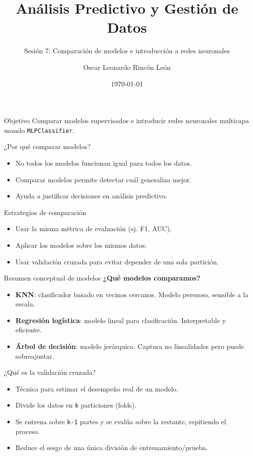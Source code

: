 \documentclass{beamer}
\title{Análisis Predictivo y Gestión de Datos}
\subtitle{Sesión 7: Comparación de modelos e introducción a redes neuronales}
\author{Oscar Leonardo Rincón León}
\date{\today}
\begin{document}
\begin{frame}
  \titlepage
\end{frame}

\begin{frame}{Objetivo}
  Comparar modelos supervisados e introducir redes neuronales multicapa usando \texttt{MLPClassifier}.
\end{frame}

\begin{frame}{¿Por qué comparar modelos?}
  \begin{itemize}
    \item No todos los modelos funcionan igual para todos los datos.
    \item Comparar modelos permite detectar cuál generaliza mejor.
    \item Ayuda a justificar decisiones en análisis predictivo.
  \end{itemize}
\end{frame}

\begin{frame}{Estrategias de comparación}
  \begin{itemize}
    \item Usar la misma métrica de evaluación (ej. F1, AUC).
    \item Aplicar los modelos sobre los mismos datos.
    \item Usar validación cruzada para evitar depender de una sola partición.
  \end{itemize}
\end{frame}

\begin{frame}{Resumen conceptual de modelos}
  \textbf{¿Qué modelos comparamos?}
  \begin{itemize}
    \item \textbf{KNN}: clasificador basado en vecinos cercanos. Modelo perezoso, sensible a la escala.
    \item \textbf{Regresión logística}: modelo lineal para clasificación. Interpretable y eficiente.
    \item \textbf{Árbol de decisión}: modelo jerárquico. Captura no linealidades pero puede sobreajustar.
  \end{itemize}
\end{frame}

\begin{frame}{¿Qué es la validación cruzada?}
  \begin{itemize}
    \item Técnica para estimar el desempeño real de un modelo.
    \item Divide los datos en \texttt{k} particiones (folds).
    \item Se entrena sobre \texttt{k-1} partes y se evalúa sobre la restante, repitiendo el proceso.
    \item Reduce el sesgo de una única división de entrenamiento/prueba.
  \end{itemize}
\end{frame}
\end{document}
